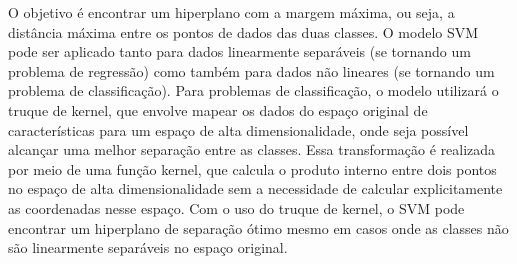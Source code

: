 \documentclass[12pt,oneside,a4paper,chapter=TITLE,
			   english,brazil]{abntex2}
\begin{document}
O objetivo é encontrar um hiperplano com a margem máxima, ou seja, a  distância  máxima  entre  os  pontos  de  dados  das  duas  classes. O modelo SVM pode ser aplicado tanto para dados linearmente separáveis (se tornando um problema de regressão) como também para dados não lineares (se tornando um problema de classificação). Para problemas de classificação, o modelo utilizará o truque de kernel, que envolve mapear os dados do espaço original de características para um espaço de alta dimensionalidade, onde seja possível alcançar uma melhor separação entre as classes.  Essa transformação é realizada por meio de uma função kernel, que calcula o produto interno entre dois pontos no espaço de alta dimensionalidade sem a necessidade de calcular explicitamente as coordenadas nesse espaço. Com o uso do truque de kernel, o SVM pode encontrar um hiperplano de separação ótimo mesmo em casos onde as classes não são linearmente separáveis no espaço original.












    



\end{document}
